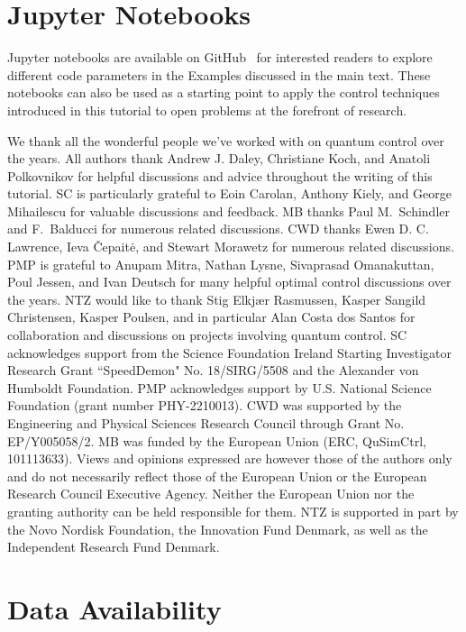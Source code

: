 \section*{Jupyter Notebooks}

Jupyter notebooks are available on GitHub~\cite{github_code} for interested readers to explore different code parameters in the Examples discussed in the main text. These notebooks can also be used as a starting point to apply the control techniques introduced in this tutorial to open problems at the forefront of research. 

\acknowledgments
We thank all the wonderful people we've worked with on quantum control over the years. All authors thank Andrew J. Daley, Christiane Koch, and Anatoli Polkovnikov for helpful discussions and advice throughout the writing of this tutorial.
SC is particularly grateful to Eoin Carolan, Anthony Kiely, and George Mihailescu for valuable discussions and feedback. MB thanks Paul M.~Schindler and F.~Balducci for numerous related discussions. CWD thanks Ewen D. C. Lawrence, Ieva \v Cepait\.e, and Stewart Morawetz for numerous related discussions. PMP is grateful to Anupam Mitra, Nathan Lysne, Sivaprasad Omanakuttan, Poul Jessen, and Ivan Deutsch for many helpful optimal control discussions over the years. NTZ would like to thank Stig Elkj{\ae}r Rasmussen, Kasper Sangild Christensen, Kasper Poulsen, and in particular Alan Costa dos Santos for collaboration and discussions on projects involving quantum control.
SC acknowledges support from the Science Foundation Ireland Starting Investigator Research Grant ``SpeedDemon" No. 18/SIRG/5508 and the Alexander von Humboldt Foundation. PMP acknowledges support by U.S. National Science
Foundation (grant number PHY-2210013). CWD was supported by the Engineering and Physical Sciences Research Council through Grant No. EP/Y005058/2. MB was funded by the European Union (ERC, QuSimCtrl, 101113633). Views and opinions expressed are however those of the authors only and do not necessarily reflect those of the European Union or the European Research Council Executive Agency. Neither the European Union nor the granting authority can be held responsible for them. NTZ is supported in part by the Novo Nordisk Foundation, the Innovation Fund Denmark, as well as the Independent Research Fund Denmark. 

\section*{Data Availability} 

